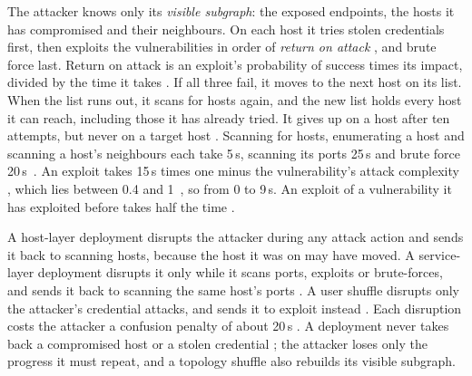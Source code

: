 \documentclass{cshonours}
\begin{document}
The attacker knows only its \emph{visible subgraph}: the exposed
endpoints, the hosts it has compromised and their neighbours. On each host
it tries stolen credentials first, then exploits the vulnerabilities in
order of \emph{return on attack} \citep{brown2023}, and brute force last.
Return on attack is an exploit's probability of success times
its impact, divided by the time it takes \citep{tay2024code}.
If all three fail, it moves to the next host on its list. When the list runs
out, it scans for hosts again, and the new list holds every host it can reach,
including those it has already tried. It gives up on a host after ten
attempts, but never on a target host \citep{brown2023}.
Scanning for hosts, enumerating a host and scanning a host's neighbours
each take 5\,s, scanning its ports 25\,s and brute force
20\,s~\citep{tay2024code}. An exploit takes 15\,s times one minus the
vulnerability's attack complexity \citep{tay2024code}, which lies between 0.4 and
1~\citep{brown2023}, so from 0 to 9\,s. An exploit of a vulnerability it
has exploited before takes half the time \citep{zhang2023}.

A host-layer deployment disrupts the attacker
during any attack action and sends it back to scanning hosts, because the host it
was on may have moved. A service-layer deployment disrupts it only while
it scans ports, exploits or brute-forces, and sends it back to scanning the
same host's ports \citep{brown2023, zhang2023}. A user shuffle disrupts only the
attacker's credential attacks, and sends it to exploit instead \citep{brown2023}. Each disruption costs the
attacker a confusion penalty \citep{zhang2023} of about 20\,s \citep{tay2024code}. A deployment never
takes back a compromised host \citep{zhang2023} or a stolen credential \citep{tay2024code}; the
attacker loses only the progress it must repeat, and a topology shuffle also
rebuilds its visible subgraph.
\end{document}
